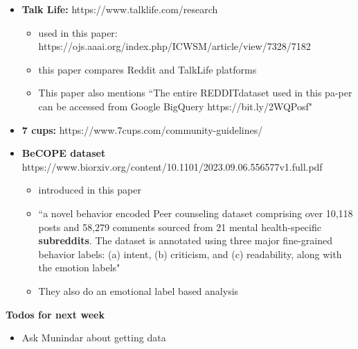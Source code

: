 \documentclass[letterpaper, 10pt]{article}
\begin{document}
\begin{itemize}
\begin{itemize}
\begin{itemize}
        \end{itemize}
        \item \textbf{Talk Life:} https://www.talklife.com/research
        \begin{itemize}
            \item used in this paper: https://ojs.aaai.org/index.php/ICWSM/article/view/7328/7182
            \item this paper compares Reddit and TalkLife platforms
            \item This paper also mentions ``The entire REDDITdataset used in this pa-per can be accessed from Google BigQuery https://bit.ly/2WQPosf"
        \end{itemize}
        \item \textbf{7 cups:} https://www.7cups.com/community-guidelines/
        \item \textbf{BeCOPE dataset} https://www.biorxiv.org/content/10.1101/2023.09.06.556577v1.full.pdf
        \begin{itemize}
            \item introduced in this paper
            \item ``a novel behavior encoded Peer counseling dataset comprising over 10,118 posts and 58,279 comments sourced from 21 mental health-specific \textbf{subreddits}. The dataset is annotated using three major fine-grained behavior labels: (a) intent, (b) criticism, and (c) readability, along with the emotion labels"
            \item They also do an emotional label based analysis
        \end{itemize}
    \end{itemize}
\end{itemize}

\textbf{Todos for next week}
\begin{itemize}
    \item Ask Munindar about getting data
\end{itemize}
\end{document}
